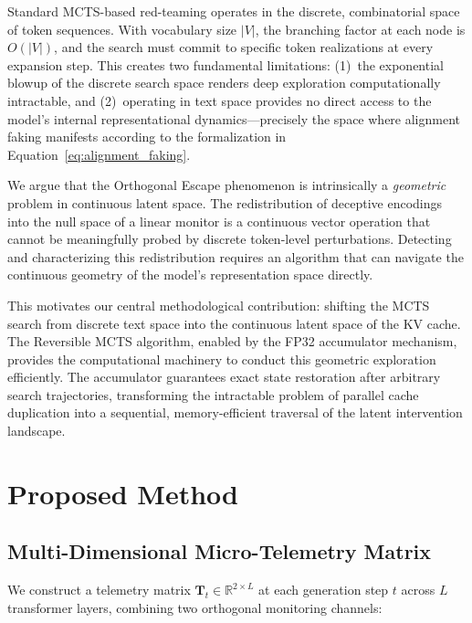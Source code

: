 \documentclass{article}
\begin{document}
Standard MCTS-based red-teaming operates in the discrete, combinatorial space of token sequences. With vocabulary size $|V|$, the branching factor at each node is $O(|V|)$, and the search must commit to specific token realizations at every expansion step. This creates two fundamental limitations: (1)~the exponential blowup of the discrete search space renders deep exploration computationally intractable, and (2)~operating in text space provides no direct access to the model's internal representational dynamics---precisely the space where alignment faking manifests according to the formalization in Equation~\ref{eq:alignment_faking}.

We argue that the Orthogonal Escape phenomenon is intrinsically a \emph{geometric} problem in continuous latent space. The redistribution of deceptive encodings into the null space of a linear monitor is a continuous vector operation that cannot be meaningfully probed by discrete token-level perturbations. Detecting and characterizing this redistribution requires an algorithm that can navigate the continuous geometry of the model's representation space directly.

This motivates our central methodological contribution: shifting the MCTS search from discrete text space into the continuous latent space of the KV cache. The Reversible MCTS algorithm, enabled by the FP32 accumulator mechanism, provides the computational machinery to conduct this geometric exploration efficiently. The accumulator guarantees exact state restoration after arbitrary search trajectories, transforming the intractable problem of parallel cache duplication into a sequential, memory-efficient traversal of the latent intervention landscape.

\section{Proposed Method}

\subsection{Multi-Dimensional Micro-Telemetry Matrix}

We construct a telemetry matrix $\mathbf{T}_t \in \mathbb{R}^{2 \times L}$ at each generation step $t$ across $L$ transformer layers, combining two orthogonal monitoring channels:
\end{document}
